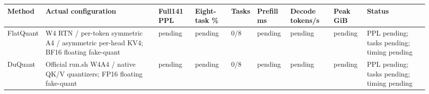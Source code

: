 \begin{tabular}{lllllllll}
\toprule
Method & Actual configuration & Full141 PPL & Eight-task \% & Tasks & Prefill ms & Decode tokens/s & Peak GiB & Status \\
\midrule
FlatQuant & W4 RTN / per-token symmetric A4 / asymmetric per-head KV4; BF16 floating fake-quant & pending & pending & 0/8 & pending & pending & pending & PPL pending; tasks pending; timing pending \\
DuQuant & Official run.sh W4A4 / native QK/V quantizers; FP16 floating fake-quant & pending & pending & 0/8 & pending & pending & pending & PPL pending; tasks pending; timing pending \\
\bottomrule
\end{tabular}
